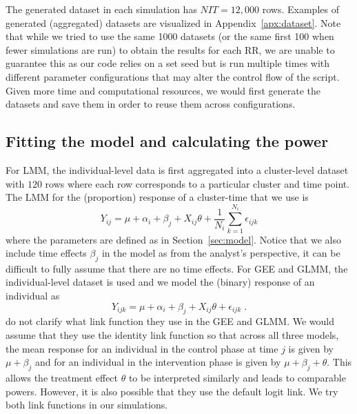 \documentclass[10pt]{article}
\begin{document}
The generated dataset in each simulation has $NIT=12,\!000$ rows. Examples of generated (aggregated) datasets are visualized in Appendix~\ref{apx:dataset}. Note that while we tried to use the same 1000 datasets (or the same first 100 when fewer simulations are run) to obtain the results for each RR, we are unable to guarantee this as our code relies on a set seed but is run multiple times with different parameter configurations that may alter the control flow of the script. Given more time and computational resources, we would first generate the datasets and save them in order to reuse them across configurations.

\subsection{Fitting the model and calculating the power} \label{sec:sim:power}

For LMM, the individual-level data is first aggregated into a cluster-level dataset with $120$ rows where each row corresponds to a particular cluster and time point. The LMM for the (proportion) response of a cluster-time that we use is
\[
Y_{ij} = \mu + \alpha_i + \beta_j + X_{ij}\theta + \frac{1}{N_i}\sum_{k=1}^{N_i}\epsilon_{ijk}
\]
where the parameters are defined as in Section~\ref{sec:model}. Notice that we also include time effects $\beta_j$ in the model as from the analyst's perspective, it can be difficult to fully assume that there are no time effects. For GEE and GLMM, the individual-level dataset is used and we model the (binary) response of an individual as
\[
Y_{ijk} = \mu + \alpha_i + \beta_j + X_{ij}\theta + \epsilon_{ijk} \;.
\]
\citeauthor{Hussey:2007} do not clarify what link function they use in the GEE and GLMM. We would assume that they use the identity link function so that across  all three models, the mean response for an individual in the control phase at time $j$ is given by $\mu + \beta_j$ and for an individual in the intervention phase is given by $\mu+\beta_j+\theta$. This allows the treatment effect $\theta$ to be interpreted similarly and leads to comparable powers. However, it is also possible that they use the default logit link. We try both link functions in our simulations.
\\
\end{document}
